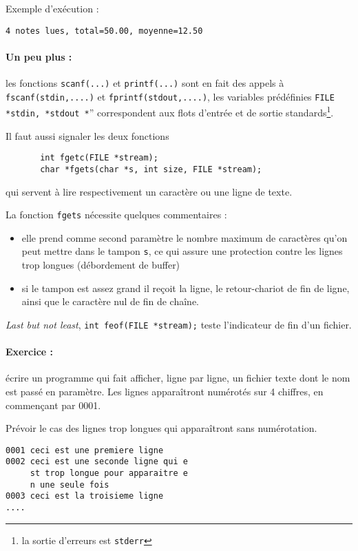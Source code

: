 \documentclass[10pt]{article}
\begin{document}
Exemple d'exécution :
\begin{verbatim}
4 notes lues, total=50.00, moyenne=12.50
\end{verbatim}

\paragraph{Un peu plus : }  les fonctions \texttt{scanf(...)} 
et \texttt{printf(...)}  sont en fait des appels à
\texttt{fscanf(stdin,....)} et \texttt{fprintf(stdout,....)}, les
variables prédéfinies \texttt{FILE *stdin, *stdout
  *}''  correspondent aux flots d'entrée et de sortie
standards\footnote{la sortie d'erreurs est \texttt{stderr}}.

Il faut aussi signaler les deux fonctions
\begin{verbatim}
       int fgetc(FILE *stream);
       char *fgets(char *s, int size, FILE *stream);
\end{verbatim}
qui servent à lire respectivement un caractère ou une ligne de texte.

La fonction \texttt{fgets} nécessite quelques commentaires : 
\begin{itemize}
\item elle prend comme second paramètre le nombre maximum de caractères
qu'on peut mettre dans le tampon \texttt{s}, ce qui assure une protection contre les lignes trop longues (débordement de buffer)
\item si le tampon est assez grand il reçoit la ligne, le retour-chariot de fin de ligne, ainsi que le caractère nul de fin de chaîne. 
\end{itemize}
\emph{Last but not least}, \texttt{int feof(FILE *stream);} teste
l'indicateur de fin d'un fichier.
\paragraph{Exercice : } écrire un programme qui fait afficher, ligne par ligne,
un fichier texte dont le nom est passé en paramètre. Les lignes apparaîtront numérotés sur 4 chiffres, en commençant par 0001.

Prévoir le cas des lignes trop longues qui apparaîtront sans numérotation.

\begin{verbatim}
0001 ceci est une premiere ligne
0002 ceci est une seconde ligne qui e
     st trop longue pour apparaitre e
     n une seule fois
0003 ceci est la troisieme ligne
....
\end{verbatim}
\end{document}
